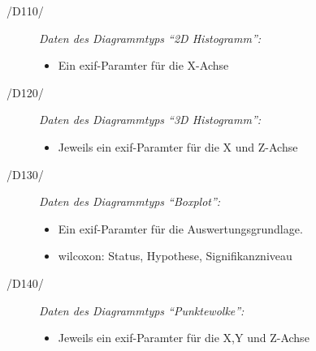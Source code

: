 \begin{description}

	\item[/D110/] \textit{Daten des Diagrammtyps "`2D Histogramm"':}
	\begin{itemize}
		\item Ein \gls{exif}-Paramter für die X-Achse
	\end{itemize}
				
	\item[/D120/] \textit{Daten des Diagrammtyps "`3D Histogramm"':}
		\begin{itemize}
		\item Jeweils ein \gls{exif}-Paramter für die X und Z-Achse
	\end{itemize}
	
	\item[/D130/] \textit{Daten des Diagrammtyps "`Boxplot"':}
		\begin{itemize}
		\item Ein \gls{exif}-Paramter für die Auswertungsgrundlage.
		\item \gls{wilcoxon}: Status, Hypothese, Signifikanzniveau
	\end{itemize}
	
	\item[/D140/] \textit{Daten des Diagrammtyps "`Punktewolke"':}
		\begin{itemize}
		\item Jeweils ein \gls{exif}-Paramter für die X,Y und Z-Achse
	\end{itemize}

\end{description}
